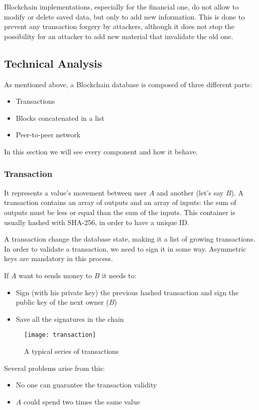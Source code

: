 Blockchain implementations, especially for the financial one, do not allow to
modify or delete saved data, but only to add new information. This is done to
prevent any transaction forgery by attackers, although it does not stop the
possibility for an attacker to add new material that invalidate the old one.

\subsection{Technical Analysis}

As mentioned above, a Blockchain database is composed of three different
parts\cite{sok15}:
\begin{itemize}
 \item Transactions
 \item Blocks concatenated in a list
 \item Peer-to-peer network
\end{itemize}

In this section we will see every component and how it behave.

\subsubsection{Transaction}
It represents a value's movement between user $A$ and another (let's
say $B$). A transaction contains an array of outputs and an array of
inputs\cite{sok15}: the sum of outputs must be less or equal than the sum of
the inputs.
This container is usually hashed with SHA-256, in order to have a
unique ID.

A transaction change the database state, making it a list of growing
transactions.
In order to validate a transaction, we need to sign it in some way. Asymmetric
keys are mandatory in this process.

If $A$ want to sends money to $B$ it needs to:
\begin{itemize}
 \item Sign (with his private key) the previous hashed transaction and sign the
public key of the next owner ($B$)
 \item Save all the signatures in the chain
\end{itemize}

\begin{figure}[ht]
 \centering
 \texttt{[image: transaction]}
 \caption{A typical series of transactions}
\end{figure}

Several problems arise from this:
\begin{itemize}
 \item No one can guarantee the transaction validity
 \item $A$ could spend two times the same value
\end{itemize}

